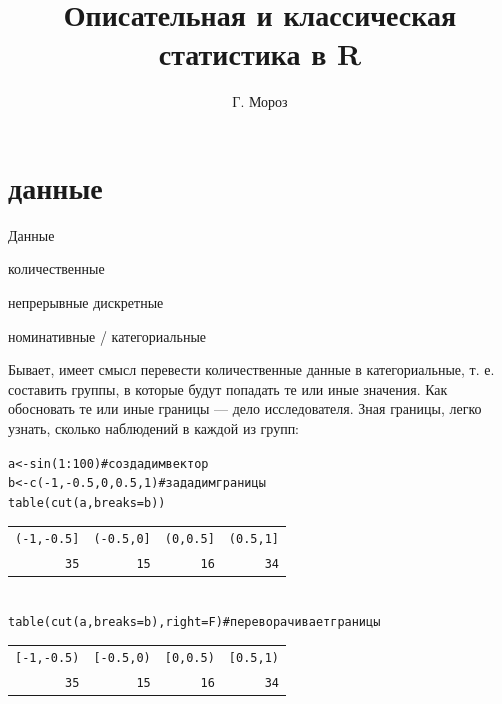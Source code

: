
\usepackage{subfig}
\newcommand{\mcrot}[4]{\multicolumn{#1}{#2}{\rlap{\rotatebox{#3}{#4}~}}} 
\title[]{Описательная и классическая статистика в R}
\author[]{Г. Мороз}
\date{}

\frame{\titlepage}
\section{данные}
\begin{frame}{Данные}
\begin{itemize}
\mytem количественные
\begin{itemize}
\mytem непрерывные
\mytem дискретные
\end{itemize}
\mytem номинативные / категориальные
\end{itemize}
Бывает, имеет смысл перевести количественные данные в категориальные, т. е. составить группы, в которые будут попадать те или иные значения. Как обосновать те или иные границы — дело исследователя. Зная границы, легко узнать, сколько наблюдений в каждой из групп:
\scriptsize
\begin{alltt}
a <- sin(1:100) \hfill \# создадим вектор\\
b <- c(-1, -0.5, 0, 0.5, 1) \hfill \# зададим границы\\
\alert{table(cut(a, breaks = b))} \medskip\\
\begin{tabular}{llll}
(-1,-0.5] & (-0.5,0] & (0,0.5] & (0.5,1] \\ 
\multicolumn{1}{r}{35} & \multicolumn{1}{r}{15} & \multicolumn{1}{r}{16} & \multicolumn{1}{r}{34} \\ 
\end{tabular}
\bigskip \\
\alert{table(cut(a, breaks = b), right = F)  \hfill \# переворачивает границы} \medskip\\
\begin{tabular}{llll}
[-1,-0.5) & [-0.5,0) & [0,0.5) & [0.5,1) \\ 
\multicolumn{1}{r}{35} & \multicolumn{1}{r}{15} & \multicolumn{1}{r}{16} & \multicolumn{1}{r}{34} \\ 
\end{tabular}
\end{alltt}
\normalsize
\end{frame}
